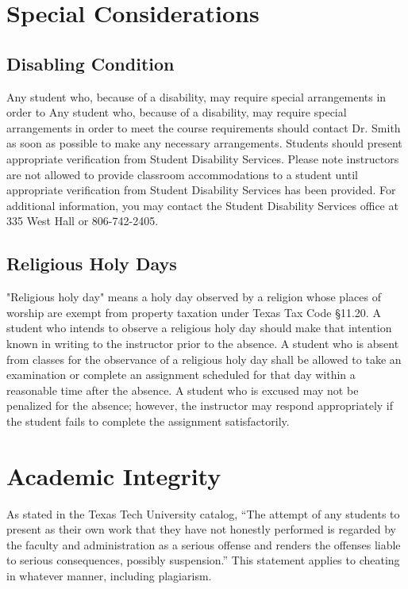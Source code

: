 \documentclass[12pt, notitlepage]{article}   	%
\begin{document}
{\section{Special Considerations}
\subsection{Disabling Condition}
Any student who, because of a disability, may require special arrangements in order to 
Any student who, because of a disability, may require special arrangements in order to 
meet the course requirements should contact Dr. Smith as soon as possible to make 
any necessary arrangements. Students should present appropriate verification from Student 
Disability Services. Please note instructors are not 
allowed to provide classroom accommodations to a student until appropriate verification 
from Student Disability Services has been provided. For additional information, you may 
contact the Student Disability Services office at 335 West Hall or 806-742-2405.

\subsection{Religious Holy Days}
"Religious holy day" means a holy day observed by a religion whose places of worship are 
exempt from property taxation under Texas Tax Code §11.20.
A student who intends to observe a religious holy day should make that intention known 
in writing to the instructor prior to the absence. A student who is absent from classes 
for the observance of a religious holy day shall be allowed to take an examination or 
complete an assignment scheduled for that day within a reasonable time after the absence.
A student who is excused may not be penalized for the absence; however, the instructor 
may respond appropriately if the student fails to complete the assignment satisfactorily.

\section{Academic Integrity}
As stated in the Texas Tech University catalog, “The attempt of any students to present 
as their own work that they have not honestly performed is regarded by the faculty and 
administration as a serious offense and renders the offenses liable to serious 
consequences, possibly suspension.” This statement applies to cheating in whatever 
manner, including plagiarism.

}
\end{document}
